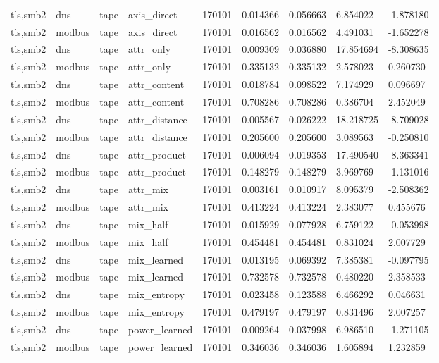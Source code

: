 \begin{tabular}{lllllllll}
tls,smb2 & dns & tape & axis\_direct & 170101 & 0.014366 & 0.056663 & 6.854022 & -1.878180 \\
tls,smb2 & modbus & tape & axis\_direct & 170101 & 0.016562 & 0.016562 & 4.491031 & -1.652278 \\
tls,smb2 & dns & tape & attr\_only & 170101 & 0.009309 & 0.036880 & 17.854694 & -8.308635 \\
tls,smb2 & modbus & tape & attr\_only & 170101 & 0.335132 & 0.335132 & 2.578023 & 0.260730 \\
tls,smb2 & dns & tape & attr\_content & 170101 & 0.018784 & 0.098522 & 7.174929 & 0.096697 \\
tls,smb2 & modbus & tape & attr\_content & 170101 & 0.708286 & 0.708286 & 0.386704 & 2.452049 \\
tls,smb2 & dns & tape & attr\_distance & 170101 & 0.005567 & 0.026222 & 18.218725 & -8.709028 \\
tls,smb2 & modbus & tape & attr\_distance & 170101 & 0.205600 & 0.205600 & 3.089563 & -0.250810 \\
tls,smb2 & dns & tape & attr\_product & 170101 & 0.006094 & 0.019353 & 17.490540 & -8.363341 \\
tls,smb2 & modbus & tape & attr\_product & 170101 & 0.148279 & 0.148279 & 3.969769 & -1.131016 \\
tls,smb2 & dns & tape & attr\_mix & 170101 & 0.003161 & 0.010917 & 8.095379 & -2.508362 \\
tls,smb2 & modbus & tape & attr\_mix & 170101 & 0.413224 & 0.413224 & 2.383077 & 0.455676 \\
tls,smb2 & dns & tape & mix\_half & 170101 & 0.015929 & 0.077928 & 6.759122 & -0.053998 \\
tls,smb2 & modbus & tape & mix\_half & 170101 & 0.454481 & 0.454481 & 0.831024 & 2.007729 \\
tls,smb2 & dns & tape & mix\_learned & 170101 & 0.013195 & 0.069392 & 7.385381 & -0.097795 \\
tls,smb2 & modbus & tape & mix\_learned & 170101 & 0.732578 & 0.732578 & 0.480220 & 2.358533 \\
tls,smb2 & dns & tape & mix\_entropy & 170101 & 0.023458 & 0.123588 & 6.466292 & 0.046631 \\
tls,smb2 & modbus & tape & mix\_entropy & 170101 & 0.479197 & 0.479197 & 0.831496 & 2.007257 \\
tls,smb2 & dns & tape & power\_learned & 170101 & 0.009264 & 0.037998 & 6.986510 & -1.271105 \\
tls,smb2 & modbus & tape & power\_learned & 170101 & 0.346036 & 0.346036 & 1.605894 & 1.232859 \\

\end{tabular}
